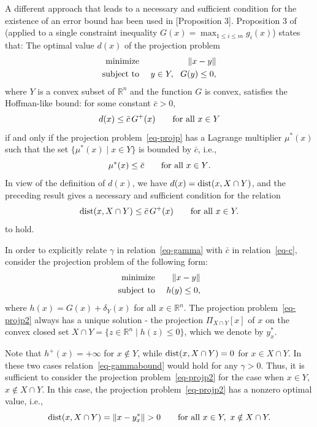 \documentclass{article}
\def\rn{\mathbb{R}^n}
\def\dist{{\rm dist}}
\theoremstyle{plain}
\theoremstyle{definition}
\theoremstyle{remark}
\begin{document}
A different approach that leads to a necessary and sufficient condition for the existence of an error bound has been used in \cite{bertsekas1999note} [Proposition 3]. Proposition 3 of \cite{bertsekas1999note} (applied to a single constraint inequality $G(x)=\max_{1\le i\le m} g_i(x)$) states that: 
The optimal value $d(x)$ of the projection problem
\begin{eqnarray}\label{eq-projp}
    \hbox{minimize } && \|x- y\|\cr
\hbox{subject to }  && y\in Y, \ \ G(y) \le 0,
\end{eqnarray}
where $Y$ is a convex subset of $\rn$ and the function $G$ is convex, satisfies the Hoffman-like bound: for some constant $\bar c>0$,
\[d(x)\le \bar c\, G^+(x)\qquad\hbox{for all } x\in Y\]
 if and only if the projection problem~\eqref{eq-projp} has a Lagrange multiplier
$\mu^*(x)$ such that the set $\{\mu^*(x)\mid x\in Y\}$ is bounded by $\bar c$, i.e., 
\begin{equation} \label{eq-c}
\mu^*(x)\le \bar c \qquad\hbox{for all $x\in Y$}.
\end{equation}
In view of the definition of $d(x)$, we have $d(x)=\dist(x, X\cap Y)$, and the preceding result gives a necessary and sufficient condition for the relation
\begin{equation} \label{eq-cbound}
\dist(x, X\cap Y)\le \bar c\, G^+(x)\qquad\hbox{for all } x\in Y.
\end{equation}
to hold.

In order to explicitly relate $\gamma$ in relation~\eqref{eq-gamma} with $\bar c$ in relation~\eqref{eq-c}, consider the projection problem of the following form:
\begin{eqnarray}\label{eq-projp2}
    \hbox{minimize } && \|x- y\|\cr
\hbox{subject to }  && h(y)\le 0,
\end{eqnarray}
where $h(x)=G(x)+\delta_Y(x)$ for all $x\in\mathbb{R}^n$. 
The projection problem~\eqref{eq-projp2} always has a unique solution - the projection $\Pi_{X\cap Y}[x]$ of $x$ on the convex closed set 
$X\cap Y=\{z\in\mathbb{R}^n\mid h(z)\le0\}$, which we denote by $y^*_x$.

Note that $h^+(x)=+\infty$ for $x\notin Y$, while $\dist(x,X\cap Y)=0$ for $x\in X\cap Y$. In these two cases relation~\eqref{eq-gammabound} would hold for any $\gamma>0$. Thus,
it is sufficient to consider the projection problem~\eqref{eq-projp2} for the case when $x\in Y$, $x\notin X\cap Y$. In this case, the projection problem~\eqref{eq-projp2} has a nonzero optimal value, i.e.,
\[\dist(x,X\cap Y)=\|x- y^*_x\|>0\qquad
\hbox{for all }x\in Y,\ x\notin X\cap Y.\]
\end{document}
